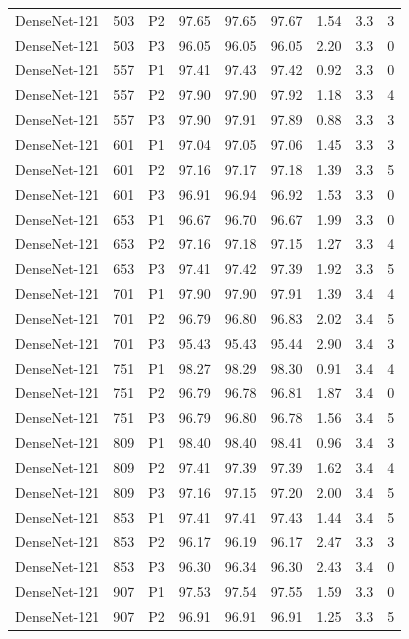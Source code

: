 {\begin{longtable}{lrlrrrrrr}
DenseNet-121 & 503 & P2 & 97.65 & 97.65 & 97.67 & 1.54 & 3.3 & 3 \\
DenseNet-121 & 503 & P3 & 96.05 & 96.05 & 96.05 & 2.20 & 3.3 & 0 \\
DenseNet-121 & 557 & P1 & 97.41 & 97.43 & 97.42 & 0.92 & 3.3 & 0 \\
DenseNet-121 & 557 & P2 & 97.90 & 97.90 & 97.92 & 1.18 & 3.3 & 4 \\
DenseNet-121 & 557 & P3 & 97.90 & 97.91 & 97.89 & 0.88 & 3.3 & 3 \\
DenseNet-121 & 601 & P1 & 97.04 & 97.05 & 97.06 & 1.45 & 3.3 & 3 \\
DenseNet-121 & 601 & P2 & 97.16 & 97.17 & 97.18 & 1.39 & 3.3 & 5 \\
DenseNet-121 & 601 & P3 & 96.91 & 96.94 & 96.92 & 1.53 & 3.3 & 0 \\
DenseNet-121 & 653 & P1 & 96.67 & 96.70 & 96.67 & 1.99 & 3.3 & 0 \\
DenseNet-121 & 653 & P2 & 97.16 & 97.18 & 97.15 & 1.27 & 3.3 & 4 \\
DenseNet-121 & 653 & P3 & 97.41 & 97.42 & 97.39 & 1.92 & 3.3 & 5 \\
DenseNet-121 & 701 & P1 & 97.90 & 97.90 & 97.91 & 1.39 & 3.4 & 4 \\
DenseNet-121 & 701 & P2 & 96.79 & 96.80 & 96.83 & 2.02 & 3.4 & 5 \\
DenseNet-121 & 701 & P3 & 95.43 & 95.43 & 95.44 & 2.90 & 3.4 & 3 \\
DenseNet-121 & 751 & P1 & 98.27 & 98.29 & 98.30 & 0.91 & 3.4 & 4 \\
DenseNet-121 & 751 & P2 & 96.79 & 96.78 & 96.81 & 1.87 & 3.4 & 0 \\
DenseNet-121 & 751 & P3 & 96.79 & 96.80 & 96.78 & 1.56 & 3.4 & 5 \\
DenseNet-121 & 809 & P1 & 98.40 & 98.40 & 98.41 & 0.96 & 3.4 & 3 \\
DenseNet-121 & 809 & P2 & 97.41 & 97.39 & 97.39 & 1.62 & 3.4 & 4 \\
DenseNet-121 & 809 & P3 & 97.16 & 97.15 & 97.20 & 2.00 & 3.4 & 5 \\
DenseNet-121 & 853 & P1 & 97.41 & 97.41 & 97.43 & 1.44 & 3.4 & 5 \\
DenseNet-121 & 853 & P2 & 96.17 & 96.19 & 96.17 & 2.47 & 3.3 & 3 \\
DenseNet-121 & 853 & P3 & 96.30 & 96.34 & 96.30 & 2.43 & 3.4 & 0 \\
DenseNet-121 & 907 & P1 & 97.53 & 97.54 & 97.55 & 1.59 & 3.3 & 0 \\
DenseNet-121 & 907 & P2 & 96.91 & 96.91 & 96.91 & 1.25 & 3.3 & 5 \\

\end{longtable}}
